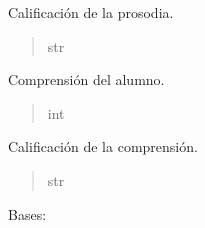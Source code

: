 \documentclass[letterpaper,10pt,spanish]{sphinxmanual}
\begin{document}
\begin{fulllineitems}
\begin{fulllineitems}
\end{fulllineitems}



\begin{fulllineitems}

\pysigstartsignatures
{}
\pysigstopsignatures
\sphinxAtStartPar
Calificación de la prosodia.
\begin{quote}\begin{description}
\sphinxAtStartPar
str

\end{description}\end{quote}

\end{fulllineitems}



\begin{fulllineitems}

\pysigstartsignatures
{}
\pysigstopsignatures
\sphinxAtStartPar
Comprensión del alumno.
\begin{quote}\begin{description}
\sphinxAtStartPar
int

\end{description}\end{quote}

\end{fulllineitems}



\begin{fulllineitems}

\pysigstartsignatures
{}
\pysigstopsignatures
\sphinxAtStartPar
Calificación de la comprensión.
\begin{quote}\begin{description}
\sphinxAtStartPar
str

\end{description}\end{quote}

\end{fulllineitems}



\begin{fulllineitems}

\pysigstartsignatures
{}
\pysigstopsignatures
\sphinxAtStartPar
Bases: 


\end{fulllineitems}
\end{fulllineitems}
\end{document}
